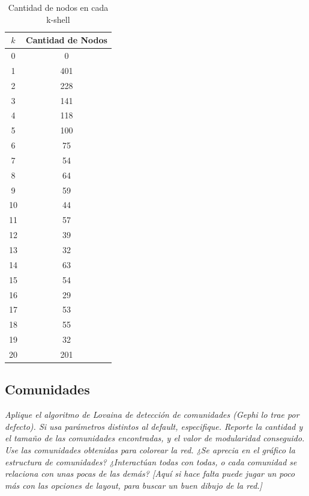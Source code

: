\documentclass[12pt]{article}
\begin{document}
\begin{table}[H]
    \centering
    \begin{tabular}{|c|c|}
        \hline
        \textbf{\( k \)} & \textbf{Cantidad de Nodos} \\ \hline
        0  & 0   \\ \hline
        1  & 401 \\ \hline
        2  & 228 \\ \hline
        3  & 141 \\ \hline
        4  & 118 \\ \hline
        5  & 100 \\ \hline
        6  & 75  \\ \hline
        7  & 54  \\ \hline
        8  & 64  \\ \hline
        9  & 59  \\ \hline
        10 & 44  \\ \hline
        11 & 57  \\ \hline
        12 & 39  \\ \hline
        13 & 32  \\ \hline
        14 & 63  \\ \hline
        15 & 54  \\ \hline
        16 & 29  \\ \hline
        17 & 53  \\ \hline
        18 & 55  \\ \hline
        19 & 32  \\ \hline
        20 & 201 \\ \hline
    \end{tabular}
    \caption{Cantidad de nodos en cada k-shell}
    \label{tab:k_shells}
\end{table}

\subsection{Comunidades} 
\textit{Aplique el algoritmo de Lovaina de detección de comunidades (Gephi lo trae por defecto). Si usa parámetros distintos al default, especifique. Reporte la cantidad y el tamaño de las comunidades encontradas, y el valor de modularidad conseguido. Use las comunidades obtenidas para colorear la red. ¿Se aprecia en el gráfico la estructura de comunidades? ¿Interactúan todas con todas, o cada comunidad se relaciona con unas pocas de las demás? [Aquí si hace falta puede jugar un poco más con las opciones de layout, para buscar un buen dibujo de la red.]}
\end{document}
